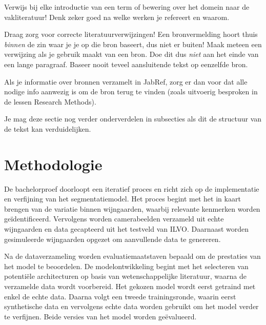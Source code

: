Verwijs bij elke introductie van een term of bewering over het domein naar de vakliteratuur! Denk zeker goed na welke werken je refereert en waarom.

Draag zorg voor correcte literatuurverwijzingen! Een bronvermelding hoort thuis \emph{binnen} de zin waar je je op die bron baseert, dus niet er buiten! Maak meteen een verwijzing als je gebruik maakt van een bron. Doe dit dus \emph{niet} aan het einde van een lange paragraaf. Baseer nooit teveel aansluitende tekst op eenzelfde bron.

Als je informatie over bronnen verzamelt in JabRef, zorg er dan voor dat alle nodige info aanwezig is om de bron terug te vinden (zoals uitvoerig besproken in de lessen Research Methods).


Je mag deze sectie nog verder onderverdelen in subsecties als dit de structuur van de tekst kan verduidelijken.

\section{Methodologie}%
\label{sec:methodologie}

De bachelorproef doorloopt een iteratief proces en richt zich op de implementatie en verfijning van het segmentatiemodel. Het proces begint met het in kaart brengen van de variatie binnen wijngaarden, waarbij relevante kenmerken worden geïdentificeerd. Vervolgens worden camerabeelden verzameld uit echte wijngaarden en data gecapteerd uit het testveld van ILVO. Daarnaast worden gesimuleerde wijngaarden opgezet om aanvullende data te genereren.

Na de dataverzameling worden evaluatiemaatstaven bepaald om de prestaties van het model te beoordelen. De modelontwikkeling begint met het selecteren van potentiële architecturen op basis van wetenschappelijke literatuur, waarna de verzamelde data wordt voorbereid. Het gekozen model wordt eerst getraind met enkel de echte data. Daarna volgt een tweede trainingsronde, waarin eerst synthetische data en vervolgens echte data worden gebruikt om het model verder te verfijnen. Beide versies van het model worden geëvalueerd.

